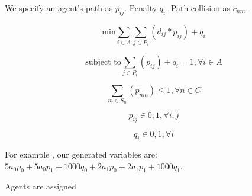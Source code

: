 \documentclass[a4paper,11pt]{article}
\begin{document}
We specify an agent's path as $p_{ij}$. Penalty $q_i$. Path collision as $c_{nm}$.

\begin{equation}
\text{min} \sum_{i \in A} \sum_{j \in P_i} (d_{ij} * p_{ij}) + q_i
\end{equation}

\begin{equation} %
\text{subject to} \sum_{j \in P_i} (p_{ij}) + q_i = 1, \forall i \in A
\end{equation}

\begin{equation} %
\sum_{m \in S_n} (p_{nm}) \le 1, \forall n \in C
\end{equation}

\begin{equation} %
p_{ij} \in {0, 1}, \forall i, j
\end{equation}

\begin{equation}
q_{i} \in {0, 1}, \forall i
\end{equation}

For example \cite{put example!}, our generated variables are: $5a_0p_0 + 5a_0p_1 + 1000q_0 + 2a_1p_0 + 2a_1p_1 + 1000q_1$.

Agents are assigned





	
\end{document}
